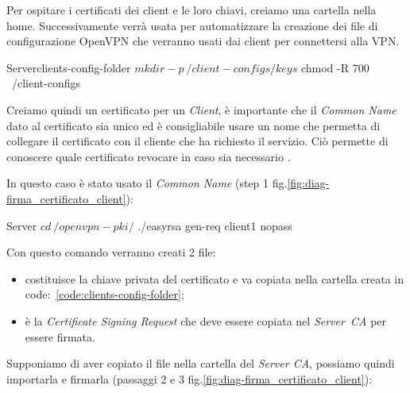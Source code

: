 Per ospitare i certificati dei client e le loro chiavi, creiamo una cartella nella home. Successivamente verrà usata per automatizzare la creazione dei file di configurazione OpenVPN che verranno usati dai client per connettersi alla VPN.

\begin{bashcode}{Server}{clients-config-folder}
$ mkdir -p ~/client-configs/keys
$ chmod -R 700 ~/client-configs
\end{bashcode}

Creiamo quindi un certificato per un \textit{Client}, è importante che il \textit{Common Name} dato al certificato sia unico ed è consigliabile usare un nome che permetta di collegare il certificato con il cliente che ha richiesto il servizio. Ciò permette di conoscere quale certificato revocare in caso sia necessario \cite{revoke-cert}.

In questo caso è stato usato il \textit{Common Name}  (step 1 fig.\ref{fig:diag-firma_certificato_client}):

\begin{bashcode}{Server}{}
$ cd ~/openvpn-pki/
$ ./easyrsa gen-req client1 nopass
\end{bashcode}

Con questo comando verranno creati 2 file: 
\begin{itemize}
    \item {} costituisce la chiave privata del certificato e va copiata nella cartella creata in code:~\ref{code:clients-config-folder};
    \item {} è la \textit{Certificate Signing Request} che deve essere copiata nel \mbox{\textit{Server CA}} per essere firmata.
\end{itemize}

Supponiamo di aver copiato il file  nella cartella  del \textit{Server CA}, possiamo quindi importarla e firmarla (passaggi 2 e 3 fig.\ref{fig:diag-firma_certificato_client}):



